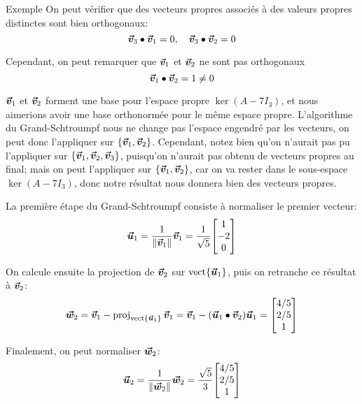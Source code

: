 \documentclass[a4paper]{article}
\begin{document}
\begin{parag}{Exemple}
    On peut vérifier que des vecteurs propres associés à des valeurs propres distinctes sont bien orthogonaux:
    \[\bm{\protect\vec{v}}_3 \bullet \bm{\protect\vec{v}}_1 = 0, \quad \bm{\protect\vec{v}}_3 \bullet \bm{\protect\vec{v}}_2 = 0\]

    Cependant, on peut remarquer que $\bm{\protect\vec{v}}_1$ et $\bm{\protect\vec{v}}_2$ ne sont pas orthogonaux
    \[\bm{\protect\vec{v}}_1 \bullet \bm{\protect\vec{v}}_2 = 1 \neq 0\]

    $\bm{\protect\vec{v}}_1$ et $\bm{\protect\vec{v}}_2$ forment une base pour l'espace propre $\ker\left(A - 7I_3\right)$, et nous aimerions avoir une base orthonormée pour le même espace propre. L'algorithme du Grand-Schtroumpf nous ne change pas l'espace engendré par les vecteurs, on peut donc l'appliquer sur $\left\{\bvec{v}_1, \bvec{v}_2\right\}$. Cependant, notez bien qu'on n'aurait pas pu l'appliquer sur $\left\{\bvec{v}_1, \bvec{v}_2, \bvec{v}_3\right\}$, puisqu'on n'aurait pas obtenu de vecteurs propres au final; mais on peut l'appliquer sur $\left\{\bvec{v}_1, \bvec{v}_2\right\}$, car on va rester dans le sous-espace $\ker\left(A - 7I_3\right)$, donc notre résultat nous donnera bien des vecteurs propres.

    La première étape du Grand-Schtroumpf consiste à normaliser le premier vecteur:
    \[\bvec{u}_1 = \frac{1}{\left\|\bvec{v}_1\right\|} \bvec{v}_1 = \frac{1}{\sqrt{5}} \begin{bmatrix} 1 \\ -2 \\ 0 \end{bmatrix} \]

    On calcule ensuite la projection de $\bm{\protect\vec{v}}_2$ sur $\vect\left\{\bvec{u}_1\right\}$, puis on retranche ce résultat à $\bm{\protect\vec{v}}_2$:
    \[\bvec{w}_2 = \bvec{v}_1 - \proj_{\vect\left\{\bvec{u}_1\right\}}\bvec{v}_1 = \bvec{v}_1- \left(\bvec{u}_1 \dotprod \bvec{v}_2\right) \bvec{u}_1 = \begin{bmatrix} 4 / 5 \\ 2 / 5 \\ 1 \end{bmatrix} \]

    Finalement, on peut normaliser $\bm{\protect\vec{w}}_2$:
    \[\bvec{u}_2 = \frac{1}{\left\|\bvec{w}_2\right\|} \bvec{w}_2 = \frac{\sqrt{5}}{3} \begin{bmatrix} 4 / 5 \\ 2 / 5 \\ 1 \end{bmatrix} \]


\end{parag}
\end{document}
